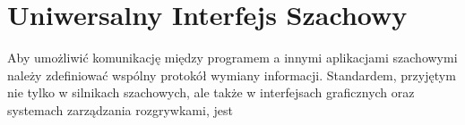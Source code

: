 \section{Uniwersalny Interfejs Szachowy}
\label{sec:uniwersalny-interfejs-szachowy}

Aby umożliwić komunikację między programem a innymi aplikacjami szachowymi należy zdefiniować wspólny protokół wymiany informacji.
Standardem, przyjętym nie tylko w silnikach szachowych, ale także w interfejsach graficznych oraz systemach zarządzania rozgrywkami, jest








